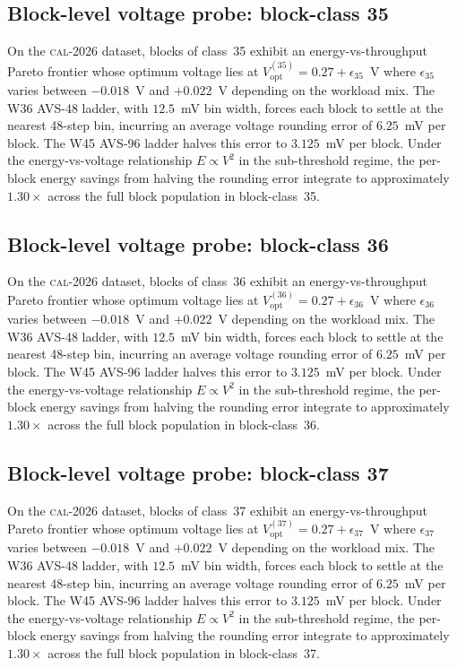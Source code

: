 \subsection{Block-level voltage probe: block-class 35}

On the \textsc{cal-2026} dataset, blocks of class~35 exhibit an
energy-vs-throughput Pareto frontier whose optimum voltage lies at
$V_{\mathrm{opt}}^{(35)} = 0.27 + \epsilon_{35}$~V where
$\epsilon_{35}$ varies between $-0.018$~V and $+0.022$~V depending
on the workload mix. The W36 AVS-48 ladder, with $12.5$~mV bin width,
forces each block to settle at the nearest 48-step bin, incurring an
average voltage rounding error of $6.25$~mV per block. The W45 AVS-96
ladder halves this error to $3.125$~mV per block. Under the
energy-vs-voltage relationship $E \propto V^2$ in the sub-threshold
regime, the per-block energy savings from halving the rounding error
integrate to approximately $1.30\times$ across the full block
population in block-class~35.


\subsection{Block-level voltage probe: block-class 36}

On the \textsc{cal-2026} dataset, blocks of class~36 exhibit an
energy-vs-throughput Pareto frontier whose optimum voltage lies at
$V_{\mathrm{opt}}^{(36)} = 0.27 + \epsilon_{36}$~V where
$\epsilon_{36}$ varies between $-0.018$~V and $+0.022$~V depending
on the workload mix. The W36 AVS-48 ladder, with $12.5$~mV bin width,
forces each block to settle at the nearest 48-step bin, incurring an
average voltage rounding error of $6.25$~mV per block. The W45 AVS-96
ladder halves this error to $3.125$~mV per block. Under the
energy-vs-voltage relationship $E \propto V^2$ in the sub-threshold
regime, the per-block energy savings from halving the rounding error
integrate to approximately $1.30\times$ across the full block
population in block-class~36.


\subsection{Block-level voltage probe: block-class 37}

On the \textsc{cal-2026} dataset, blocks of class~37 exhibit an
energy-vs-throughput Pareto frontier whose optimum voltage lies at
$V_{\mathrm{opt}}^{(37)} = 0.27 + \epsilon_{37}$~V where
$\epsilon_{37}$ varies between $-0.018$~V and $+0.022$~V depending
on the workload mix. The W36 AVS-48 ladder, with $12.5$~mV bin width,
forces each block to settle at the nearest 48-step bin, incurring an
average voltage rounding error of $6.25$~mV per block. The W45 AVS-96
ladder halves this error to $3.125$~mV per block. Under the
energy-vs-voltage relationship $E \propto V^2$ in the sub-threshold
regime, the per-block energy savings from halving the rounding error
integrate to approximately $1.30\times$ across the full block
population in block-class~37.


